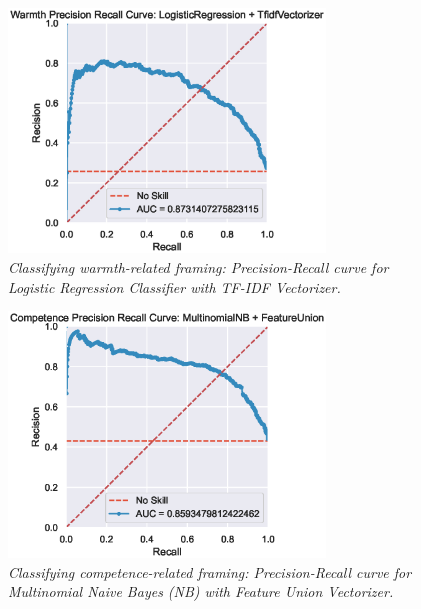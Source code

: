 \documentclass[Royal,sageapa,times]{sagej}
\begin{document}
\begin{figure}[ht]
    \setlength{\fboxsep}{0pt}%
    \setlength{\fboxrule}{0pt}%
    \begin{center}
    \includegraphics[width=0.75\textwidth]{FT/Figure8.eps}
    \end{center}
    \caption{\textit{Classifying warmth-related framing: Precision-Recall curve for Logistic Regression Classifier with TF-IDF Vectorizer.}}
    \label{figure8}
    \end{figure}

\begin{figure}[ht]
    \setlength{\fboxsep}{0pt}%
    \setlength{\fboxrule}{0pt}%
    \begin{center}
    \includegraphics[width=0.75\textwidth]{FT/Figure9.eps}
    \end{center}
    \caption{\textit{Classifying competence-related framing: Precision-Recall curve for Multinomial Naive Bayes (NB) with Feature Union Vectorizer.}}
    \label{figure9}
    \end{figure}
\end{document}
